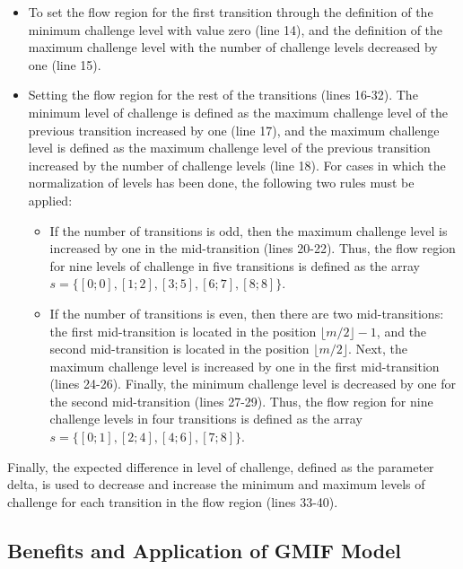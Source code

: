 \begin{itemize}
\item To set the flow region for the first transition through the definition of the minimum challenge level with value zero (line 14), and the definition of the maximum challenge level with the number of challenge levels decreased by one (line 15).
\item Setting the flow region for the rest of the transitions (lines 16-32).
The minimum level of challenge is defined as the maximum challenge level of the previous transition increased by one (line 17), and the maximum challenge level is defined as the maximum challenge level of the previous transition increased by the number of challenge levels (line 18). 
For cases in which the normalization of levels has been done, the following two rules must be applied:

\begin{itemize}
\item If the number of transitions is odd, then the maximum challenge level is increased by one in the mid-transition (lines 20-22).
Thus, the flow region for nine levels of challenge in five transitions is defined as the array $s = \{[0;0], [1;2], [3;5], [6;7], [8;8]\}$.
\item If the number of transitions is even, then there are two mid-transitions:
the first mid-transition is located in the position $\lfloor m/2 \rfloor - 1$, and the second mid-transition is located in the position $\lfloor m/2 \rfloor$.
Next, the maximum challenge level is increased by one in the first mid-transition (lines 24-26). Finally, the minimum challenge level is decreased by one for the second mid-transition (lines 27-29).
Thus, the flow region for nine challenge levels in four transitions is defined as the array $s = \{[0;1], [2;4], [4;6], [7;8]\}$.
\end{itemize}
\end{itemize}

Finally, the expected difference in level of challenge, defined as the parameter delta, is used to decrease and increase the minimum and maximum levels of challenge for each transition in the flow region (lines 33-40).

\subsection{Benefits and Application of GMIF Model}

